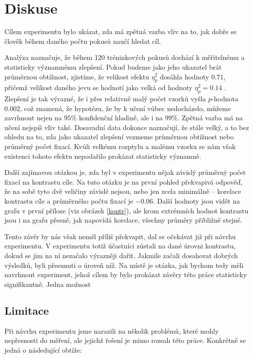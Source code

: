 \chapter{Diskuse}

Cílem experimentu bylo ukázat, zda má zpětná vazba vliv na to, jak dobře se
člověk během daného počtu pokusů naučí hledat cíl.

Analýza naznačuje, že během 120 tréninkových pokusů dochází k měřitelnému a
statisticky významnému zlepšení. Pokud budeme jako jeho ukazatel brát průměrnou
obtížnost, zjistíme, že velikost efektu $\eta^2_p$ dosáhla hodnoty $0.71$,
přičemž velikost daného jevu se hodnotí jako velká od hodnoty $\eta^2_p=0.14$
\citep{Cohen}. Zlepšení je tak výrazné, že i přes relativně malý počet vzorků
vyšla $p$-hodnota $0.002$, což znamená, že hypotézu, že by k učení vůbec
nedocházelo, můžeme zavrhnout nejen na $95\%$ konfidenční hladině, ale i na
$99\%$. Zpětná vazba má na učení nejspíš vliv také. Dosavadní data dokonce
naznačují, že stále velký, a to bez ohledu na to, zda jako ukazatel zlepšení
vezmeme průměrnou obtížnost nebo průměrný počet fixací. Kvůli velkému rozptylu
a malému vzorku se nám však existenci tohoto efektu nepodařilo prokázat
statisticky významně.

Další zajímavou otázkou je, zda byl v experimentu nějak závislý průměrný počet
fixací na kontrastu cíle. Na tuto otázku je na první pohled překvapivá odpověď,
že na sobě tyto dvě veličiny závislé nejsou, nebo jen zcela minimálně --
korelace kontrastu cíle a průměrného počtu fixací je $-0.06$. Další hodnoty
jsou vidět na grafu v první příloze (viz obrázek \ref{kontr}), ale krom
extrémních hodnot kontrastu jsou i na grafu přesně, jak napovídá korelace,
všechny průměry přibližně stejné.

Tento závěr by nás však neměl příliš překvapit, dal se očekávat již při návrhu
experimentu. V experimentu totiž účastníci zústali na dané úrovni kontrastu,
dokud se jim na ní nezačalo výrazněji dařit. Jakmile začali dosahovat dobrých
výsledků, byli přesunuti o úroveň níž. Na místě je otázka, jak bychom tedy měli
navrhnout experiment, jehož cílem by bylo prokázat závěry této práce
statisticky signifikantně. Jedna možnost   

\section{Limitace}

Při návrhu experimentu jsme narazili na několik problémů, které mohly
nepřesnosti do měření, ale jejichž řešení je mimo rozsah této práce. Konkrétně
se jedná o následující obtíže:

